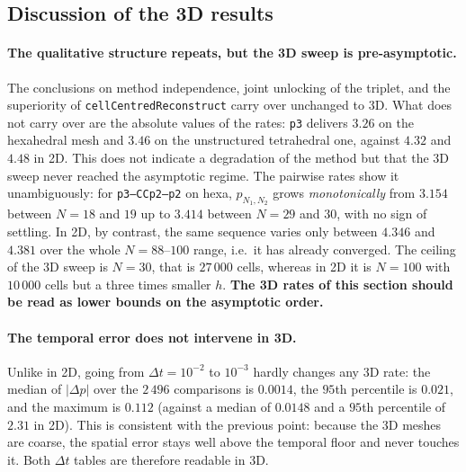 \documentclass[11pt,a4paper]{article}
\newcommand{\code}[1]{\texttt{\small #1}}
\begin{document}


\FloatBarrier

\subsection{Discussion of the 3D results}
\label{sec:en-conclusions-3d}

\paragraph{The qualitative structure repeats, but the 3D sweep is
pre-asymptotic.}
The conclusions on method independence, joint unlocking of the triplet, and the
superiority of \code{cellCentredReconstruct} carry over unchanged to 3D. What
does not carry over are the absolute values of the rates: \code{p3} delivers
$3.26$ on the hexahedral mesh and $3.46$ on the unstructured tetrahedral one,
against $4.32$ and $4.48$ in 2D. This does not indicate a degradation of the
method but that the 3D sweep never reached the asymptotic regime. The pairwise
rates show it unambiguously: for \code{p3--CCp2--p2} on hexa, $p_{N_1,N_2}$
grows \emph{monotonically} from $3.154$ between $N=18$ and $19$ up to $3.414$
between $N=29$ and $30$, with no sign of settling. In 2D, by contrast, the same
sequence varies only between $4.346$ and $4.381$ over the whole $N=88$--$100$
range, i.e.\ it has already converged. The ceiling of the 3D sweep is $N=30$,
that is $27\,000$ cells, whereas in 2D it is $N=100$ with $10\,000$ cells but a
three times smaller $h$. \textbf{The 3D rates of this section should be read as
lower bounds on the asymptotic order.}

\paragraph{The temporal error does not intervene in 3D.}
Unlike in 2D, going from $\Delta t=10^{-2}$ to $10^{-3}$ hardly changes any 3D
rate: the median of $|\Delta p|$ over the $2\,496$ comparisons is $0.0014$, the
$95$th percentile is $0.021$, and the maximum is $0.112$ (against a median of
$0.0148$ and a $95$th percentile of $2.31$ in 2D). This is consistent with the
previous point: because the 3D meshes are coarse, the spatial error stays well
above the temporal floor and never touches it. Both $\Delta t$ tables are
therefore readable in 3D.
\end{document}
